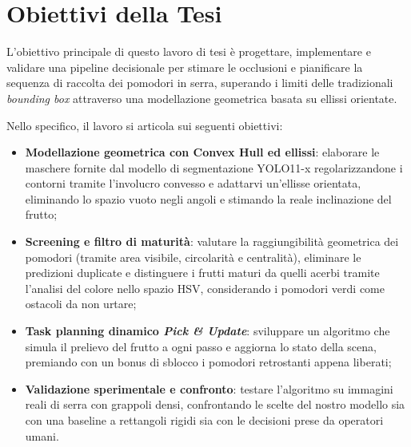 \section{Obiettivi della Tesi}
\label{sec:obiettivi_tesi}

L'obiettivo principale di questo lavoro di tesi è progettare, implementare e 
validare una pipeline decisionale per stimare le occlusioni e pianificare la sequenza 
di raccolta dei pomodori in serra, superando i limiti delle tradizionali 
\textit{bounding box} attraverso una modellazione geometrica basata su ellissi orientate.

Nello specifico, il lavoro si articola sui seguenti obiettivi:
\begin{itemize}
    \item \textbf{Modellazione geometrica con Convex Hull ed ellissi}: elaborare le 
    maschere fornite dal modello di segmentazione YOLO11-x regolarizzandone i contorni 
    tramite l'involucro convesso e adattarvi un'ellisse orientata, eliminando lo spazio 
    vuoto negli angoli e stimando la reale inclinazione del frutto;
    \item \textbf{Screening e filtro di maturità}: valutare la raggiungibilità geometrica 
    dei pomodori (tramite area visibile, circolarità e centralità), eliminare le predizioni 
    duplicate e distinguere i frutti maturi da quelli acerbi tramite l'analisi del colore 
    nello spazio HSV, considerando i pomodori verdi come ostacoli da non urtare;
    \item \textbf{Task planning dinamico \textit{Pick \& Update}}: sviluppare un algoritmo 
    che simula il prelievo del frutto a ogni passo e aggiorna lo stato della scena, 
    premiando con un bonus di sblocco i pomodori retrostanti appena liberati;
    \item \textbf{Validazione sperimentale e confronto}: testare l'algoritmo su immagini 
    reali di serra con grappoli densi, confrontando le scelte del nostro modello sia con 
    una baseline a rettangoli rigidi sia con le decisioni prese da operatori umani.
\end{itemize}

